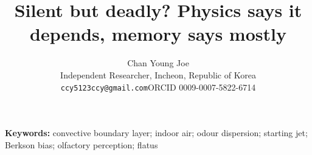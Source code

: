 \documentclass[11pt]{article}
\title{Silent but deadly? Physics says it depends, memory says mostly}
\author{Chan Young Joe\\[2pt]
  \small Independent Researcher, Incheon, Republic of Korea\\
  \small \texttt{ccy5123ccy@gmail.com}\quad ORCID 0009-0007-5822-6714}
\date{}
\begin{document}
\maketitle
\linenumbers

\begin{abstract}

\end{abstract}

\noindent\textbf{Keywords:} convective boundary layer; indoor air; odour dispersion; starting jet; Berkson bias;
olfactory perception; flatus












\end{document}
